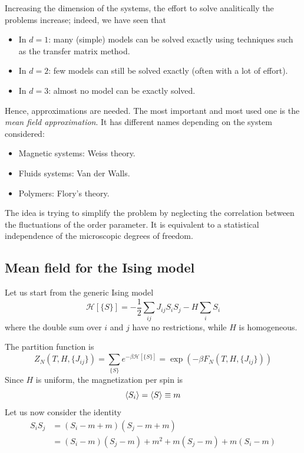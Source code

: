 \documentclass[../main/main.tex]{subfiles}
\begin{document}
Increasing the dimension of the systems, the effort to solve analitically the problems increase; indeed, we have seen that
\begin{itemize}
\item In \( d=1 \): many (simple) models can be solved exactly using techniques such as the transfer matrix method.
\item In \( d=2 \): few models can still be solved exactly (often with a lot of effort).
\item In \( d=3 \): almost no model can be exactly solved.
\end{itemize}
Hence, approximations are needed.
The most important and most used one is the \emph{mean field approximation}. 
It has different names depending on the system considered:
\begin{itemize}
\item Magnetic systems: Weiss theory.
\item Fluids systems: Van der Walls.
\item Polymers: Flory's theory.
\end{itemize}

The idea is trying to simplify the problem by neglecting the correlation between the fluctuations of the order parameter. It is equivalent to a statistical independence of the microscopic degrees of freedom.



\subsection{Mean field for the Ising model}
Let us start from the generic Ising model
\begin{equation}
  \mathcal{H} [\{ S \}  ] =  -\frac{1}{2} \sum_{ij}^{} J_{ij} S_i S_j - H \sum_{i}^{} S_i
\end{equation}
where the double sum over \( i \) and \( j \) have no restrictions, while \( H \) is homogeneous.

The partition function is
\begin{equation}
  Z_N (T,H,\{ J_{ij} \}  )= \sum_{\{ S \}  }^{} e^{-\beta   \mathcal{H} [\{ S \}] } = \exp (-\beta F_N (T,H,\{ J_{ij} \}  ))
\end{equation}
Since \( H \) is uniform, the magnetization per spin is
\begin{equation*}
  \expval{S_i}  = \expval{S} \equiv m
\end{equation*}
Let us now consider the identity
\begin{equation*}
\begin{split}
  S_i S_j  &= (S_i - m + m) (S_j - m + m)  \\
  & = (S_i - m ) (S_j - m)  + m^2 + m (S_j-m) + m (S_i-m)
\end{split}
\end{equation*}
\end{document}
